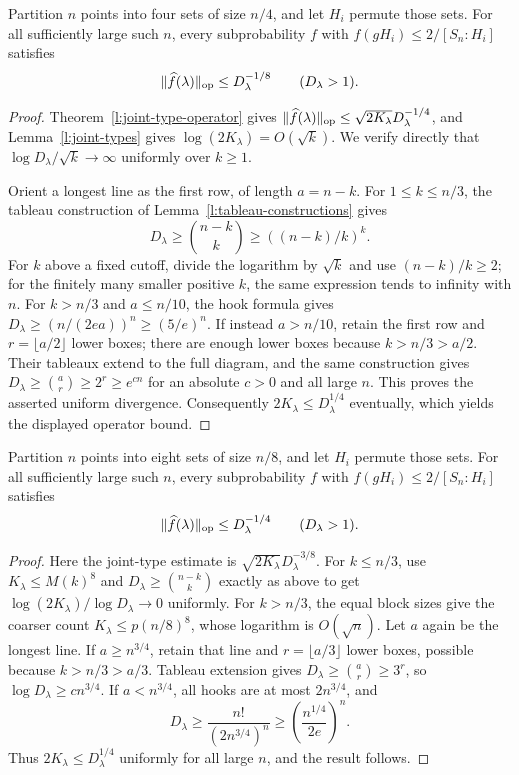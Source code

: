 \begin{corollary}
\label{l:four-block-reservoir}
Partition $n$ points into four sets of size $n/4$, and let $H_i$
permute those sets.  For all sufficiently large such $n$, every
subprobability $f$ with $f(gH_i)\le2/[S_n:H_i]$ satisfies
\[
 \|\widehat f(\lambda)\|_{\mathrm{op}}\le D_\lambda^{-1/8}
       \qquad(D_\lambda>1).
\]
\end{corollary}
\begin{proof}
Theorem~\ref{l:joint-type-operator} gives
$\|\widehat f(\lambda)\|_{\mathrm{op}}
 \le\sqrt{2K_\lambda}D_\lambda^{-1/4}$, and
Lemma~\ref{l:joint-types} gives $\log(2K_\lambda)=O(\sqrt k)$.
We verify directly that $\log D_\lambda/\sqrt k\to\infty$
uniformly over $k\ge1$.

Orient a longest line as the first row, of length $a=n-k$.
For $1\le k\le n/3$, the tableau construction of
Lemma~\ref{l:tableau-constructions} gives
\[
 D_\lambda\ge\binom{n-k}k\ge((n-k)/k)^k.
\]
For $k$ above a fixed cutoff, divide the logarithm by $\sqrt k$
and use $(n-k)/k\ge2$; for the finitely many smaller positive
$k$, the same expression tends to infinity with $n$.
For $k>n/3$ and $a\le n/10$, the hook formula gives
$D_\lambda\ge(n/(2ea))^n\ge(5/e)^n$.
If instead $a>n/10$, retain the first row and
$r=\lfloor a/2\rfloor$ lower boxes; there are enough lower boxes
because $k>n/3>a/2$.  Their tableaux extend to the full diagram,
and the same construction gives
$D_\lambda\ge\binom ar\ge2^r\ge e^{cn}$ for an absolute
$c>0$ and all large $n$.  This proves the asserted uniform divergence.
Consequently $2K_\lambda\le D_\lambda^{1/4}$ eventually,
which yields the displayed operator bound.
\end{proof}

\begin{corollary}
\label{l:eight-block-probe}
Partition $n$ points into eight sets of size $n/8$, and let $H_i$
permute those sets.  For all sufficiently large such $n$, every
subprobability $f$ with $f(gH_i)\le2/[S_n:H_i]$ satisfies
\[
 \|\widehat f(\lambda)\|_{\mathrm{op}}\le D_\lambda^{-1/4}
       \qquad(D_\lambda>1).
\]
\end{corollary}
\begin{proof}
Here the joint-type estimate is
$\sqrt{2K_\lambda}D_\lambda^{-3/8}$.
For $k\le n/3$, use $K_\lambda\le M(k)^8$ and
$D_\lambda\ge\binom{n-k}k$ exactly as above to get
$\log(2K_\lambda)/\log D_\lambda\to0$ uniformly.
For $k>n/3$, the equal block sizes give the coarser count
$K_\lambda\le p(n/8)^8$, whose logarithm is $O(\sqrt n)$.
Let $a$ again be the longest line.  If $a\ge n^{3/4}$, retain
that line and $r=\lfloor a/3\rfloor$ lower boxes, possible because
$k>n/3>a/3$.  Tableau extension gives
$D_\lambda\ge\binom ar\ge3^r$, so
$\log D_\lambda\ge c n^{3/4}$.  If $a<n^{3/4}$, all hooks
are at most $2n^{3/4}$, and
\[
 D_\lambda\ge\frac{n!}{(2n^{3/4})^n}
       \ge\left(\frac{n^{1/4}}{2e}\right)^n.
\]
Thus $2K_\lambda\le D_\lambda^{1/4}$ uniformly for all large
$n$, and the result follows.
\end{proof}

